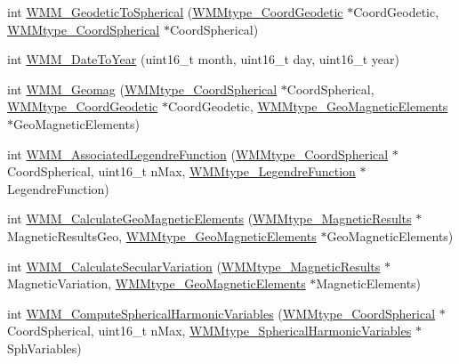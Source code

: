 \begin{DoxyCompactItemize}
\item 
int \hyperlink{group___tau_labs_libraries_ga5971db1a3c1b41047a5794e322e6a3fc}{\-W\-M\-M\-\_\-\-Geodetic\-To\-Spherical} (\hyperlink{struct_w_m_mtype___coord_geodetic}{\-W\-M\-Mtype\-\_\-\-Coord\-Geodetic} $\ast$\-Coord\-Geodetic, \hyperlink{struct_w_m_mtype___coord_spherical}{\-W\-M\-Mtype\-\_\-\-Coord\-Spherical} $\ast$\-Coord\-Spherical)
\item 
int \hyperlink{group___tau_labs_libraries_ga3ab6215b460bc2cfebe9a87443ff173a}{\-W\-M\-M\-\_\-\-Date\-To\-Year} (uint16\-\_\-t month, uint16\-\_\-t day, uint16\-\_\-t year)
\item 
int \hyperlink{group___tau_labs_libraries_ga81cea078875c7d7c71f3e8cabb8a9c7a}{\-W\-M\-M\-\_\-\-Geomag} (\hyperlink{struct_w_m_mtype___coord_spherical}{\-W\-M\-Mtype\-\_\-\-Coord\-Spherical} $\ast$\-Coord\-Spherical, \hyperlink{struct_w_m_mtype___coord_geodetic}{\-W\-M\-Mtype\-\_\-\-Coord\-Geodetic} $\ast$\-Coord\-Geodetic, \hyperlink{struct_w_m_mtype___geo_magnetic_elements}{\-W\-M\-Mtype\-\_\-\-Geo\-Magnetic\-Elements} $\ast$\-Geo\-Magnetic\-Elements)
\item 
int \hyperlink{group___tau_labs_libraries_gaf0d6a6fcdbb7366c3b56e138852d13c1}{\-W\-M\-M\-\_\-\-Associated\-Legendre\-Function} (\hyperlink{struct_w_m_mtype___coord_spherical}{\-W\-M\-Mtype\-\_\-\-Coord\-Spherical} $\ast$\-Coord\-Spherical, uint16\-\_\-t n\-Max, \hyperlink{struct_w_m_mtype___legendre_function}{\-W\-M\-Mtype\-\_\-\-Legendre\-Function} $\ast$\-Legendre\-Function)
\item 
int \hyperlink{group___tau_labs_libraries_gaeac1e1535485855275f9a1cfb7deb7d5}{\-W\-M\-M\-\_\-\-Calculate\-Geo\-Magnetic\-Elements} (\hyperlink{struct_w_m_mtype___magnetic_results}{\-W\-M\-Mtype\-\_\-\-Magnetic\-Results} $\ast$\-Magnetic\-Results\-Geo, \hyperlink{struct_w_m_mtype___geo_magnetic_elements}{\-W\-M\-Mtype\-\_\-\-Geo\-Magnetic\-Elements} $\ast$\-Geo\-Magnetic\-Elements)
\item 
int \hyperlink{group___tau_labs_libraries_ga3eac4ba39252e5ad5f623facd6d57b5b}{\-W\-M\-M\-\_\-\-Calculate\-Secular\-Variation} (\hyperlink{struct_w_m_mtype___magnetic_results}{\-W\-M\-Mtype\-\_\-\-Magnetic\-Results} $\ast$\-Magnetic\-Variation, \hyperlink{struct_w_m_mtype___geo_magnetic_elements}{\-W\-M\-Mtype\-\_\-\-Geo\-Magnetic\-Elements} $\ast$\-Magnetic\-Elements)
\item 
int \hyperlink{group___tau_labs_libraries_gac26353c9c9e52c36b2d5ac18572b4699}{\-W\-M\-M\-\_\-\-Compute\-Spherical\-Harmonic\-Variables} (\hyperlink{struct_w_m_mtype___coord_spherical}{\-W\-M\-Mtype\-\_\-\-Coord\-Spherical} $\ast$\-Coord\-Spherical, uint16\-\_\-t n\-Max, \hyperlink{struct_w_m_mtype___spherical_harmonic_variables}{\-W\-M\-Mtype\-\_\-\-Spherical\-Harmonic\-Variables} $\ast$\-Sph\-Variables)

\end{DoxyCompactItemize}
